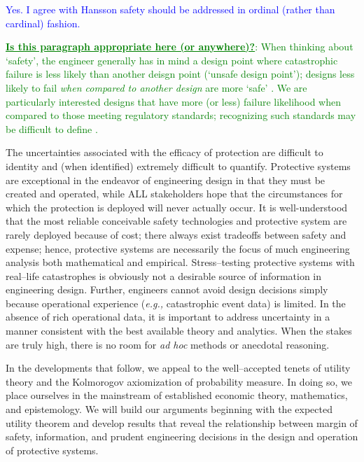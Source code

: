 \documentclass[12pt]{article}
\begin{document}
\textcolor{blue}{Yes.  I agree with Hansson safety should be addressed in ordinal (rather than cardinal) fashion.}

\textcolor{green}{{\bf \underline{Is this paragraph appropriate here (or anywhere)?}}:
When thinking about `safety', the engineer generally has in mind a design point where catastrophic failure is less likely than another deisgn point (`unsafe design point'); 
designs less likely to fail \emph{when compared to another design} are more `safe' \citet{hansson2012}.
We are particularly interested designs that have more (or less) failure likelihood when compared to those meeting 
regulatory standards; recognizing such standards may be difficult to define \citep[][for example]{Bjelland2013}.
}

The uncertainties associated with the efficacy of protection are difficult to identity and (when identified) extremely difficult to quantify.  Protective systems are exceptional in the endeavor of engineering design in that they must be created and operated, while ALL stakeholders hope that the circumstances for which the protection is deployed will never actually occur.  It is well-understood that the most reliable conceivable safety technologies and protective system are rarely deployed because of cost; there always exist tradeoffs between safety and expense; hence, protective systems are necessarily the focus of much engineering analysis both mathematical and empirical. Stress--testing protective systems with real--life catastrophes is obviously not a desirable source of information in engineering design. Further, engineers cannot avoid design decisions simply because operational experience (\emph{e.g.,} catastrophic event data) is limited.  In the absence of rich operational data, it is important to address uncertainty in a manner consistent with the best available theory and analytics.  When the stakes are truly high, there is no room for \emph{ad hoc} methods or anecdotal reasoning.

In the developments that follow, we appeal to the well--accepted tenets of utility theory and the Kolmorogov axiomization of probability measure.  In doing so, we place ourselves in the mainstream of established economic theory, mathematics, and epistemology. We will build our arguments beginning with the expected utility theorem and develop results that reveal the relationship between margin of safety, information, and prudent engineering decisions in the design and operation of protective systems.
\end{document}
